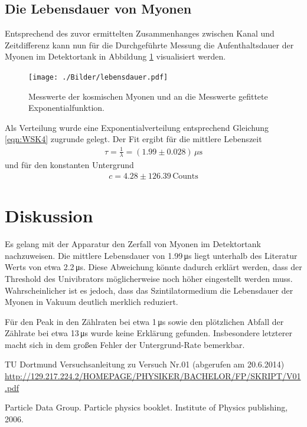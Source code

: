 \subsection{Die Lebensdauer von Myonen}
Entsprechend des zuvor ermittelten Zusammenhanges zwischen Kanal und Zeitdifferenz kann nun für die Durchgeführte Messung die Aufenthaltsdauer der Myonen im Detektortank in Abbildung \ref{fig:lebensdauer} visualisiert werden.

\begin{figure}[htbp]
	\texttt{[image: ./Bilder/lebensdauer.pdf]}
	\caption{Messwerte der kosmischen Myonen und an die Messwerte gefittete Exponentialfunktion.}
	\label{fig:lebensdauer}
\end{figure}

Als Verteilung wurde eine Exponentialverteilung entsprechend Gleichung \ref{eqn:WSK4} zugrunde gelegt. Der Fit ergibt für die mittlere Lebenszeit
\begin{align}
	\tau = \frac{1}{\lambda} = (1.99 \pm 0.028)\,\text{$\mu$s}
\end{align}
und für den konstanten Untergrund
\begin{align}
c = 4.28 \pm 126.39\,\text{Counts}
\end{align}

\section{Diskussion}
Es gelang mit der Apparatur den Zerfall von Myonen im Detektortank nachzuweisen. Die mittlere Lebensdauer von 1.99\,\si{\micro \second} liegt unterhalb des Literatur Werts von etwa 2.2\,\si{\micro\second}. Diese Abweichung könnte dadurch erklärt werden, dass der Threshold des Univibrators möglicherweise noch höher eingestellt werden muss. Wahrscheinlicher ist es jedoch, dass das Szintilatormedium die Lebensdauer der Myonen in Vakuum deutlich merklich reduziert.

Für den Peak in den Zählraten bei etwa 1\,\si{\micro\second} sowie den plötzlichen Abfall der Zählrate bei etwa 13\,\si{\micro\second} wurde keine Erklärung gefunden. Insbesondere letzterer macht sich in dem großen Fehler der Untergrund-Rate bemerkbar.

\vfill
\begin{thebibliography}{WissOnl}
 TU Dortmund Versuchsanleitung zu Versuch Nr.01 (abgerufen am 20.6.2014) \url{http://129.217.224.2/HOMEPAGE/PHYSIKER/BACHELOR/FP/SKRIPT/V01.pdf}

 Particle Data Group. Particle physics booklet. Institute of Physics publishing, 2006.

\end{thebibliography}

